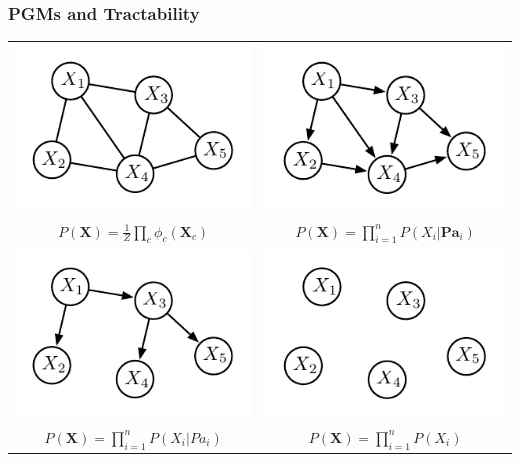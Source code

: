\documentclass[xcolor={usenames,dvipsnames,svgnames}, compress]{beamer}
\begin{document}
\begin{frame}[t]
  \frametitle{PGMs and Tractability}
  \begin{table}[!ht]
    \setlength{\tabcolsep}{22pt}
    \centering
    \begin{tabular}{c c}
      
      \includegraphics[width=0.33\linewidth]{figures/mrf} &
                                                            \includegraphics[width=0.33\linewidth]{figures/bn}\\
      \scriptsize  $P(\mathbf{X})=\frac{1}{Z}\prod_{c}\phi_{c}(\mathbf{X}_{c})$
                                                          & 
      \scriptsize $P(\mathbf{X})=\prod_{i=1}^nP(X_{i}|\mathbf{Pa}_{i})$\\
      \includegraphics[width=0.33\linewidth]{figures/clt} &
      \includegraphics[width=0.33\linewidth]{figures/nf}\\
      \scriptsize
      $P(\mathbf{X})=\prod_{i=1}^nP(X_{i}|Pa_{i})$ &
      \scriptsize $P(\mathbf{X})=\prod_{i=1}^nP(X_{i})$                                                              
    \end{tabular}
  \end{table}
\end{frame}
\end{document}
